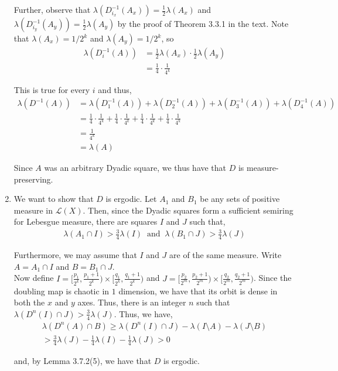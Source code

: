 \documentclass[12pt]{article}
\begin{document}
\begin{enumerate}[label=\alph*)]
Further, observe that $\lambda(D_{i_x}^{-1}(A_x)) = \frac{1}{2} \lambda(A_x)$ and $\lambda(D_{i_y}^{-1}(A_y)) = \frac{1}{2} \lambda(A_y)$ by the proof of Theorem 3.3.1 in the text. Note that $\lambda(A_x) = 1/2^k$ and $\lambda(A_y) = 1/2^k$, so
\begin{align*}
\lambda(D_i^{-1}(A)) &= \frac{1}{2} \lambda(A_x) \cdot \frac{1}{2} \lambda(A_y)\\
&= \frac{1}{4} \cdot \frac{1}{4^k}
\end{align*}

This is true for every $i$ and thus,
\begin{align*}
\lambda(D^{-1}(A)) &= \lambda(D_1^{-1}(A)) + \lambda(D_2^{-1}(A)) + \lambda(D_3^{-1}(A)) + \lambda(D_4^{-1}(A))\\
&= \frac{1}{4} \cdot \frac{1}{4^k} + \frac{1}{4} \cdot \frac{1}{4^k} +  \frac{1}{4} \cdot \frac{1}{4^k} + \frac{1}{4} \cdot \frac{1}{4^k}\\
&= \frac{1}{4^k}\\
&= \lambda(A)
\end{align*}

Since $A$ was an arbitrary Dyadic square, we thus have that $D$ is measure-preserving.

\item We want to show that $D$ is ergodic. Let $A_1$ and $B_1$ be any sets of positive measure in $\mathcal{L}(X)$. Then, since the Dyadic squares form a sufficient semiring for Lebesgue measure, there are squares $I$ and $J$ such that,
\begin{align*}
\lambda(A_1 \cap I) > \frac{3}{4} \lambda(I) \ \text{ and } \ \lambda(B_1 \cap J) > \frac{3}{4} \lambda(J)
\end{align*}

Furthermore, we may assume that $I$ and $J$ are of the same measure. Write $A = A_1 \cap I$ and $B = B_1 \cap J$.\\

Now define $I = [\frac{p_1}{2^k}, \frac{p_1+1}{2^k}) \times [\frac{q_1}{2^k}, \frac{q_1+1}{2^k})$ and $J = [\frac{p_2}{2^m}, \frac{p_2+1}{2^m}) \times [\frac{q_2}{2^m}, \frac{q_2+1}{2^m})$. Since the doubling map is chaotic in $1$ dimension, we have that its orbit is dense in both the $x$ and $y$ axes. Thus, there is an integer $n$ such that $\lambda(D^n(I) \cap J) > \frac{3}{4} \lambda(J)$. Thus, we have,
\begin{align*}
\lambda(D^n(A) \cap B) \geq \lambda(D^n(I) \cap J) - \lambda(I \setminus A) - \lambda(J \setminus B)\\
> \frac{3}{4} \lambda(J) - \frac{1}{4} \lambda(I) - \frac{1}{4} \lambda(J) > 0
\end{align*}

and, by Lemma 3.7.2(5), we have that $D$ is ergodic.

\end{enumerate}
\end{document}
